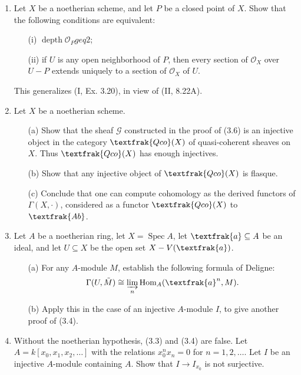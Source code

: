 \documentclass{article}
\newcommand{\goth}[1]{\textfrak{#1}}
\newcommand{\fG}{\mathscr{G}}
\newcommand{\fO}{\mathscr{O}}
\DeclareMathOperator{\depth}{depth}
\DeclareMathOperator{\spec}{Spec}
\begin{document}
\begin{enumerate} [label=\textbf{\arabic*.}, leftmargin=0em]
\item Let $X$ be a noetherian scheme, and let $P$ be a closed point of $X$. Show that the following conditions are equivalent:
\begin{itemize}
  \item[(i)] $\depth \fO_P geq 2$;
  \item[(ii)] if $U$ is any open neighborhood of $P$, then every section of $\fO_X$ over $U - P$ extends uniquely to a section of $\fO_X$ of $U$.
\end{itemize}

This generalizes (I, Ex. 3.20), in view of (II, 8.22A).

\item Let $X$ be a noetherian scheme.
\begin{itemize}
  \item[(a)] Show that the sheaf $\fG$ constructed in the proof of (3.6) is an injective object in the category $\goth{Qco}(X)$ of quasi-coherent sheaves on $X$. Thus $\goth{Qco}(X)$ has enough injectives.
  \item[(b)] Show that any injective object of $\goth{Qco}(X)$ is flasque.
  \item[(c)] Conclude that one can compute cohomology as the derived functors of $\Gamma(X, \cdot)$, considered as a functor $\goth{Qco}(X)$ to $\goth{Ab}$.
\end{itemize}

\item Let $A$ be a noetherian ring, let $X = \spec{A}$, let $\goth{a} \subseteq A$ be an ideal, and let $U \subseteq X$ be the open set $X - V(\goth{a})$.
\begin{itemize}
  \item[(a)] For any $A$-module $M$, establish the following formula of Deligne:
  \begin{equation*}
    \Gamma(U, \tilde{M}) \cong \varinjlim_n{\text{Hom}_A(\goth{a}^n, M)}.
  \end{equation*}
  \item[(b)] Apply this in the case of an injective $A$-module $I$, to give another proof of (3.4).
\end{itemize}

\item Without the noetherian hypothesis, (3.3) and (3.4) are false. Let $A = k[x_0, x_1, x_2, \dots]$ with the relations $x_0^n x_n = 0$ for $n = 1, 2, \dots$. Let $I$ be an injective $A$-module containing $A$. Show that $I \to I_{x_0}$ is not surjective.

\end{enumerate}
\end{document}
